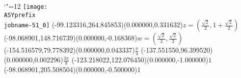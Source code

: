 \setlength{\unitlength}{1pt}%
\makeatletter%
\let\ASYencoding\f@encoding%
\let\ASYfamily\f@family%
\let\ASYseries\f@series%
\let\ASYshape\f@shape%
\makeatother%
{\catcode`"=12%
\texttt{[image: \\ASYprefix\\jobname-51\_0]}%
}%
\color{ASYcolor}%
\fontsize{12.000000}{14.400000}\selectfont%
\usefont{\ASYencoding}{\ASYfamily}{\ASYseries}{\ASYshape}%
\ASYalign(-99.123316,264.845853)(0.000000,0.331632){$z=\left(\frac{\sqrt{2}}{2}, 1+\frac{\sqrt{2}}{2}\right)$}%
\color{ASYcolor}%
\fontsize{12.000000}{14.400000}\selectfont%
\ASYalign(-98.068901,148.716739)(0.000000,-0.168368){$w=\left(\frac{\sqrt{2}}{2}, \frac{\sqrt{2}}{2}\right)$}%
\color{ASYcolor}%
\fontsize{12.000000}{14.400000}\selectfont%
\ASYalign(-154.516579,79.778392)(0.000000,0.043337){$\frac{\pi}{4}$}%
\color{ASYcolor}%
\fontsize{12.000000}{14.400000}\selectfont%
\ASYalign(-137.551550,96.399520)(0.000000,0.002296){$\frac{3\pi}{8}$}%
\color{ASYcolor}%
\fontsize{12.000000}{14.400000}\selectfont%
\ASYalign(-123.218022,122.076450)(0.000000,-1.000000){$1$}%
\color{ASYcolor}%
\fontsize{12.000000}{14.400000}\selectfont%
\ASYalign(-98.068901,205.508504)(0.000000,-0.500000){$1$}%
